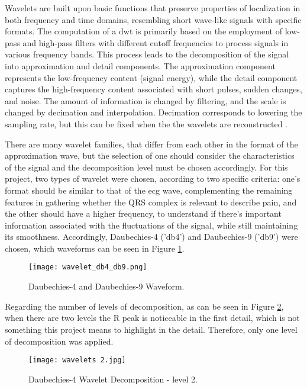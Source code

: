 Wavelets are built upon basic functions that preserve properties of localization in both frequency and time domains, resembling short wave-like signals with specific formats. The computation of a \ac{dwt} is primarily based on the employment of low-pass and high-pass filters with different cutoff frequencies to process signals in various frequency bands. This process leads to the decomposition of the signal into approximation and detail components. The approximation component represents the low-frequency content (signal energy), while the detail component captures the high-frequency content associated with short pulses, sudden changes, and noise. The amount of information is changed by filtering, and the scale is changed by decimation and interpolation. Decimation corresponds to lowering the sampling rate, but this can be fixed when the the wavelets are reconstructed \cite{Osadchiy2021}. 

There are many wavelet families, that differ from each other in the format of the approximation wave, but the selection of one should consider the characteristics of the signal and the decomposition level must be chosen accordingly. For this project, two types of wavelet were chosen, according to two specific criteria: one's format should be similar to that of the \ac{ecg} wave, complementing the remaining features in gathering whether the QRS complex is relevant to describe pain, and the other should have a higher frequency, to understand if there's important information associated with the fluctuations of the signal, while still maintaining its smoothness.
Accordingly, Daubechies-4 ('db4') and Daubechies-9 ('db9') were chosen, which waveforms can be seen in Figure \ref{fig:waveform}. 

\begin{figure}[h!]
    \centering
    \texttt{[image: wavelet\_db4\_db9.png]}
    \caption{Daubechies-4 and Daubechies-9 Waveform.}
    \label{fig:waveform}
\end{figure}



Regarding the number of levels of decomposition, as can be seen in Figure \ref{fig:wavelets2}, when there are two levels the R peak is noticeable in the first detail, which is not something this project means to highlight in the detail.
Therefore, only one level of decomposition was applied.

\begin{figure}[h!]
    \centering
    \texttt{[image: wavelets 2.jpg]}
    \caption{Daubechies-4 Wavelet Decomposition - level 2.}
    \label{fig:wavelets2}
\end{figure}


